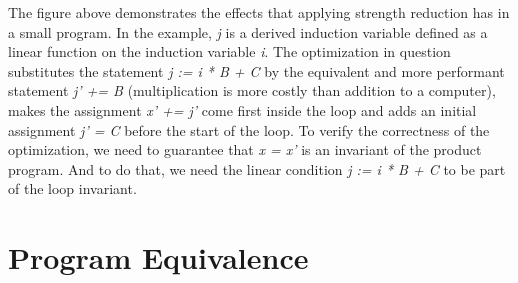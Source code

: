 \bigskip
The figure above demonstrates the effects that applying strength reduction has in a small program.
In the example, \emph{j} is a derived induction variable defined as a linear function on the induction variable \emph{i}.
The optimization in question substitutes the statement \emph{j := i * B + C} by the equivalent and more performant statement \emph{j' += B} (multiplication is more costly than addition to a computer), makes the assignment \emph{x' += j'} come first inside the loop and adds an initial assignment \emph{j' = C} before the start of the loop.
To verify the correctness of the optimization, we need to guarantee that \emph{x = x'} is an invariant of the product program.
And to do that, we need the linear condition \emph{j := i * B + C} to be part of the loop invariant.


\section{Program Equivalence}
\label{sec:program_equivalence}



